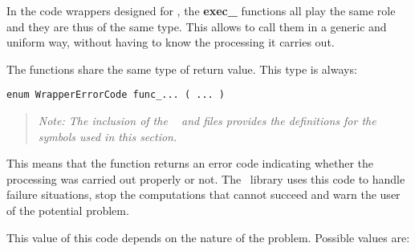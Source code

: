 In the code wrappers designed for \OT , the {\bf exec\_} functions all play the same role and they are thus of the same type. This allows to call them in a generic and uniform way, without having to know the processing it carries out.

The functions share the same type of return value. This type is always:

\lstset{language=C++, basicstyle=\normalsize}
\begin{lstlisting}[frame=TBRL]
  enum WrapperErrorCode func_... ( ... )
\end{lstlisting}

\small
\begin{quote}
  \textit{Note: The inclusion of the \OT\  and  files provides the definitions for the symbols used in this section.}
\end{quote}
\normalsize

This means that the function returns an error code indicating whether the processing was carried out properly or not. The \OT\ library uses this code to handle failure situations, stop the computations that cannot succeed and warn the user of the potential problem.

This value of this code depends on the nature of the problem. Possible values are:

